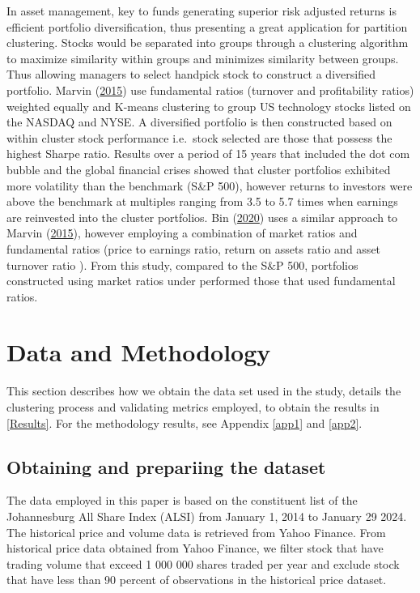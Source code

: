 \documentclass[11pt,preprint, authoryear]{elsarticle}
\numberwithin{equation}{section}
\numberwithin{figure}{section}
\numberwithin{table}{section}
\begin{document}
In asset management, key to funds generating superior risk adjusted
returns is efficient portfolio diversification, thus presenting a great
application for partition clustering. Stocks would be separated into
groups through a clustering algorithm to maximize similarity within
groups and minimizes similarity between groups. Thus allowing managers
to select handpick stock to construct a diversified portfolio. Marvin
(\protect\hyperlink{ref-marvin2015creating}{2015}) use fundamental
ratios (turnover and profitability ratios) weighted equally and K-means
clustering to group US technology stocks listed on the NASDAQ and NYSE.
A diversified portfolio is then constructed based on within cluster
stock performance i.e.~stock selected are those that possess the highest
Sharpe ratio. Results over a period of 15 years that included the dot
com bubble and the global financial crises showed that cluster
portfolios exhibited more volatility than the benchmark (S\&P 500),
however returns to investors were above the benchmark at multiples
ranging from 3.5 to 5.7 times when earnings are reinvested into the
cluster portfolios. Bin (\protect\hyperlink{ref-bin2020k}{2020}) uses a
similar approach to Marvin
(\protect\hyperlink{ref-marvin2015creating}{2015}), however employing a
combination of market ratios and fundamental ratios (price to earnings
ratio, return on assets ratio and asset turnover ratio ). From this
study, compared to the S\&P 500, portfolios constructed using market
ratios under performed those that used fundamental ratios. \newpage

\hypertarget{data-and-methodology}{%
\section{\texorpdfstring{Data and Methodology
\label{meth}}{Data and Methodology }}\label{data-and-methodology}}

This section describes how we obtain the data set used in the study,
details the clustering process and validating metrics employed, to
obtain the results in \ref{Results}. For the methodology results, see
Appendix \ref{app1} and \ref{app2}.

\hypertarget{obtaining-and-prepariing-the-dataset}{%
\subsection{Obtaining and prepariing the
dataset}\label{obtaining-and-prepariing-the-dataset}}

The data employed in this paper is based on the constituent list of the
Johannesburg All Share Index (ALSI) from January 1, 2014 to January 29
2024. The historical price and volume data is retrieved from Yahoo
Finance. From historical price data obtained from Yahoo Finance, we
filter stock that have trading volume that exceed 1 000 000 shares
traded per year and exclude stock that have less than 90 percent of
observations in the historical price dataset.
\end{document}
